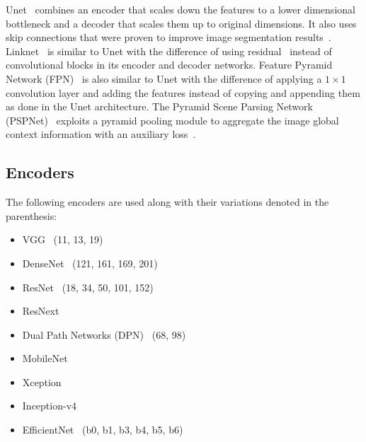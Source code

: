 \documentclass{elsarticle}
\begin{document}
Unet~\cite{ronneberger2015u} combines an encoder that scales down the
features to a lower dimensional bottleneck and a decoder that scales
them up to original dimensions.
It also uses skip connections that were proven to improve image
segmentation results~\cite{drozdzal2016importance}.
Linknet~\cite{chaurasia2017linknet} is similar to Unet with the
difference of using residual~\cite{he2016deep} instead of
convolutional blocks in its encoder and decoder networks.
Feature Pyramid Network (FPN)~\cite{lin2017feature} is also similar
to Unet with the difference of applying a $1\times1$ convolution
layer and adding the features instead of copying and appending them
as done in the Unet architecture.
The Pyramid Scene Parsing Network (PSPNet)~\cite{zhao2017pyramid}
exploits a pyramid pooling module to aggregate the image global
context information with an auxiliary loss~\cite{hu2019comparison}.

\subsection{Encoders}\label{sec:encoders}
The following encoders are used along with their variations denoted
in the parenthesis:
\begin{itemize}
  \item VGG~\cite{simonyan2014very} (11, 13, 19)
  \item DenseNet~\cite{huang2017densely} (121, 161, 169, 201)
  \item ResNet~\cite{he2016deep} (18, 34, 50, 101, 152)
  \item ResNext~\cite{xie2017aggregated}
  \item Dual Path Networks (DPN)~\cite{chen2017dual} (68, 98)
  \item MobileNet~\cite{howard2017mobilenets}
  \item Xception~\cite{chollet2017xception}
  \item Inception-v4~\cite{szegedy2017inception}
  \item EfficientNet~\cite{tan2019efficientnet} (b0, b1, b3, b4, b5, b6)
\end{itemize}
\end{document}
